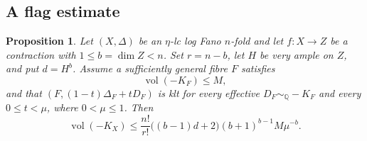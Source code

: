 \documentclass[11pt,reqno]{amsart}
\numberwithin{equation}{section}
\newtheorem{proposition}[theorem]{Proposition}
\theoremstyle{definition}
\theoremstyle{remark}
\newcommand{\Q}{\mathbb Q}
\newcommand{\simq}{\sim_{\Q}}
\newcommand{\vol}{\operatorname{vol}}
\begin{document}
\subsection{A flag estimate}
\begin{proposition}\label{prop:flag}
Let $(X,\Delta)$ be an $\eta$-lc log Fano $n$-fold and let $f:X\to Z$ be a contraction with $1\le b=\dim Z<n$. Set $r=n-b$, let $H$ be very ample on $Z$, and put $d=H^b$. Assume a sufficiently general fibre $F$ satisfies
\[
 \vol(-K_F)\le M,
\]
and that $(F,(1-t)\Delta_F+tD_F)$ is klt for every effective $D_F\simq-K_F$ and every $0\le t<\mu$, where $0<\mu\le1$. Then
\begin{equation}\label{eq:flag}
 \vol(-K_X)\le
 \frac{n!}{r!}\bigl((b-1)d+2\bigr)(b+1)^{b-1}M\mu^{-b}.
\end{equation}
\end{proposition}
\end{document}
